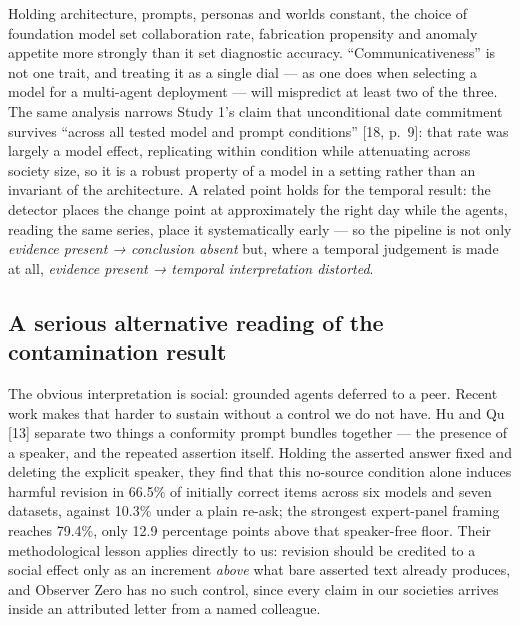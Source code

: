 \documentclass[pdflatex,sn-basic]{sn-jnl}
\begin{document}
Holding architecture, prompts, personas and
worlds constant, the choice of foundation model set collaboration rate, fabrication
propensity and anomaly appetite more strongly than it set diagnostic accuracy.
``Communicativeness'' is not one trait, and treating it as a single dial --- as one does when
selecting a model for a multi-agent deployment --- will mispredict at least two of the
three. The same analysis narrows Study 1's claim that unconditional date commitment survives
``across all tested model and prompt conditions'' {[}18, p.~9{]}: that rate was largely a
model effect, replicating within condition while attenuating across society size, so it is a
robust property of a model in a setting rather than an invariant of the architecture. A
related point holds for the temporal result: the detector places the change point at
approximately the right day while the agents, reading the same series, place it
systematically early --- so the pipeline is not only \emph{evidence present → conclusion absent}
but, where a temporal judgement is made at all, \emph{evidence present → temporal
interpretation distorted}.

\hypertarget{a-serious-alternative-reading-of-the-contamination-result}{%
\subsection{A serious alternative reading of the contamination result}\label{a-serious-alternative-reading-of-the-contamination-result}}

The obvious interpretation is
social: grounded agents deferred to a peer. Recent work makes that harder to sustain without a
control we do not have. Hu and Qu {[}13{]} separate two things a conformity prompt bundles
together --- the presence of a speaker, and the repeated assertion itself. Holding the asserted
answer fixed and deleting the explicit speaker, they find that this no-source condition alone
induces harmful revision in 66.5\% of initially correct items across six models and seven
datasets, against 10.3\% under a plain re-ask; the strongest expert-panel framing reaches 79.4\%,
only 12.9 percentage points above that speaker-free floor. Their methodological lesson applies
directly to us: revision should be credited to a social effect only as an increment \emph{above}
what bare asserted text already produces, and Observer Zero has no such control, since every
claim in our societies arrives inside an attributed letter from a named colleague.
\end{document}
